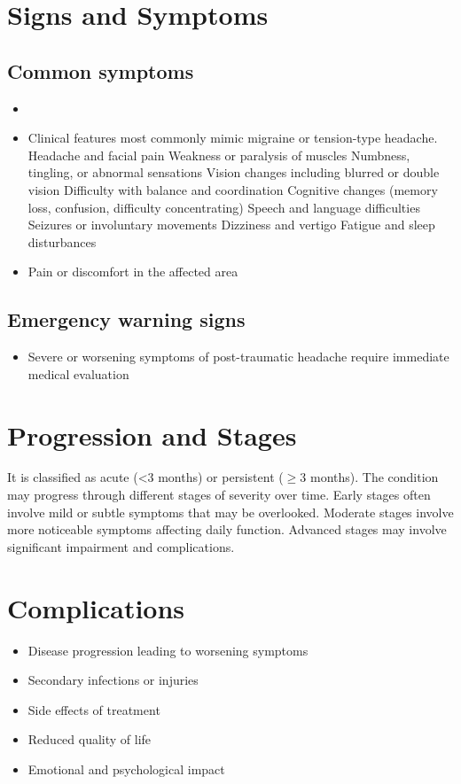 \section{Signs and Symptoms}
\subsection{Common symptoms}
\begin{itemize}[noitemsep]
  \item \item Clinical features most commonly mimic migraine or tension-type headache. Headache and facial pain Weakness or paralysis of muscles Numbness, tingling, or abnormal sensations Vision changes including blurred or double vision Difficulty with balance and coordination Cognitive changes (memory loss, confusion, difficulty concentrating) Speech and language difficulties Seizures or involuntary movements Dizziness and vertigo Fatigue and sleep disturbances
  \item Pain or discomfort in the affected area
  \end{itemize}
\subsection{Emergency warning signs}
\begin{itemize}[noitemsep]
  \item Severe or worsening symptoms of post-traumatic headache require immediate medical evaluation
\end{itemize}
\section{Progression and Stages}
It is classified as acute (<3 months) or persistent ($\ge$3 months). The condition may progress through different stages of severity over time. Early stages often involve mild or subtle symptoms that may be overlooked. Moderate stages involve more noticeable symptoms affecting daily function. Advanced stages may involve significant impairment and complications.
\section{Complications}
\begin{itemize}[noitemsep]
  \item Disease progression leading to worsening symptoms
  \item Secondary infections or injuries
  \item Side effects of treatment
  \item Reduced quality of life
  \item Emotional and psychological impact
\end{itemize}
